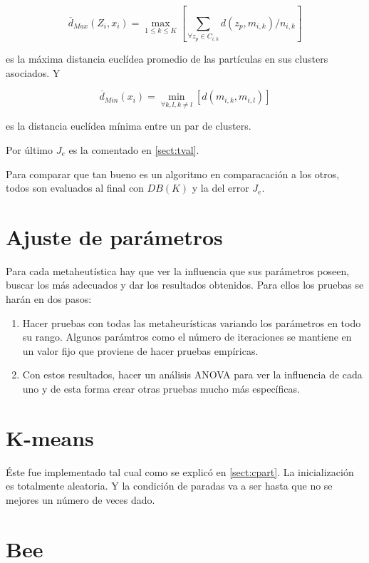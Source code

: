 \[
\overline{d}_{Max}(Z_i,x_i) = \max_{1 \leq k \leq K} \left[ \displaystyle\sum_{\forall z_p \in C_{i,k}} d(z_p,m_{i,k})/n_{i,k}\right]
\]

es la máxima distancia eucl\'idea promedio de las partículas en sus
clusters asociados. Y

\[
\overline{d}_{Min}(x_i) = \min_{\forall k, l, k \neq l} \left[ d(m_{i,k},m_{i,l})\right]
\]

es la distancia eucl\'idea mínima entre un par de clusters.

Por \'ultimo $J_e$ es la comentado en \ref{sect:tval}.

Para comparar que tan bueno es un algoritmo en comparacaci\'on a los otros, todos son evaluados al final con $DB(K)$ 
y la del error $J_e$.

\section{Ajuste de par\'ametros}  \label{chap:ajustep}

Para cada metaheut\'istica hay que ver la influencia que sus par\'ametros 
poseen, buscar los m\'as adecuados y dar los resultados obtenidos.
Para ellos los pruebas se har\'an en dos pasos:

\begin{enumerate}

\item Hacer pruebas con todas las metaheur\'isticas variando los par\'ametros 
en todo su rango. Algunos par\'amtros como el n\'umero de iteraciones se mantiene
en un valor fijo que proviene de hacer pruebas emp\'iricas.

\item Con estos resultados, hacer un an\'alisis ANOVA para ver la influencia de cada
uno y de esta forma crear otras pruebas mucho m\'as espec\'ificas.

\end{enumerate}

\section{K-means}  \label{chap:ikmeans}

\'Este fue implementado tal cual como se explic\'o en \ref{sect:cpart}. La
inicializaci\'on es totalmente aleatoria. Y la condici\'on de paradas
va a ser hasta que no se mejores un n\'umero de veces dado.

\section{Bee}  \label{chap:ibee}

